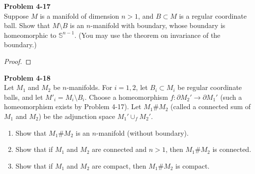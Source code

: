\documentclass[12pt, a4paper]{article}
\theoremstyle{plain}
\newcommand{\set}[1]{\mathbb{#1}}
\newenvironment{problem}[2][Problem]
    { \begin{mdframed}[backgroundcolor=gray!20] \textbf{#1 #2} \\}
    {  \end{mdframed}}
\begin{document}
\begin{problem}{4-17}
Suppose $M$ is a manifold of dimension $n>1$, and $B\subset M$ is a regular coordinate ball. Show that $M\setminus B$ is an $n$-manifold with boundary, whose boundary is homeomorphic to $\set{S}^{n-1}$. (You may use the theorem on invariance of the boundary.)
\end{problem}
    \begin{proof}
        
    \end{proof}

\begin{problem}{4-18}
Let $M_1$ and $M_2$ be $n$-manifolds. For $i=1,2$, let $B_i\subset M_i$ be regular coordinate balls, and let $M'_i=M_i\setminus B_i$. Choose a homeomorphism $f:\partial M_2'\rightarrow \partial M_1'$ (such a homeomorphism exists by Problem 4-17). Let $M_1\#M_2$ (called a connected sum of $M_1$ and $M_2$) be the adjunction space $M_1'\cup_f M_2'$.
\begin{enumerate}[label=(\alph*)]
\item Show that $M_1\#M_2$ is an $n$-manifold (without boundary).
\item Show that if $M_1$ and $M_2$ are connected and $n>1$, then $M_1\#M_2$ is connected.
\item Show that if $M_1$ and $M_2$ are compact, then $M_1\#M_2$ is compact.
\end{enumerate} 
\end{problem}
\end{document}
